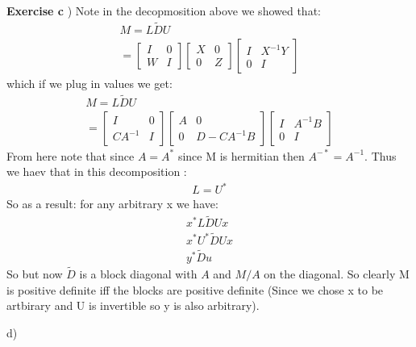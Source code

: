 \documentclass[12pt]{article}
\newenvironment{exercise}[1]{\vspace{.1in}\noindent\textbf{Exercise #1 \hspace{.05em}}}{}
\theoremstyle{definition}
\theoremstyle{remark}
\begin{document}
\begin{exercise}{6.5}
	c) Note in the decopmosition above we showed that:
	\begin{align}
		M=L\tilde{D}U \\
		=%
		\begin{bmatrix}
			I & 0 \\
			W & I
		\end{bmatrix}%
		\begin{bmatrix}
			X & 0 \\
			0 & Z
		\end{bmatrix}%
		\begin{bmatrix}
			I & X^{-1}Y \\
			0 & I
		\end{bmatrix}
	\end{align}
	which if we plug in values we get:
	\begin{align}
		M=L\tilde{D}U \\
		=%
		\begin{bmatrix}
			I       & 0 \\
			CA^{-1} & I
		\end{bmatrix}%
		\begin{bmatrix}
			A & 0          \\
			0 & D-CA^{-1}B
		\end{bmatrix}%
		\begin{bmatrix}
			I & A^{-1}B \\
			0 & I
		\end{bmatrix}
	\end{align}
	From here note that since $A=A^*$ since M is hermitian then $A^{-*}=A^{-1}$. Thus we haev that in this decomposition :
	\begin{align}
		L=U^*
	\end{align}
	So as a result: for any arbitrary x we have:
	\begin{align}
		x^*L \tilde{D}Ux   \\
		x^*U^* \tilde{D}Ux \\
		y^*\tilde D u
	\end{align}
	So but now $\tilde D$ is a block diagonal with $A$ and $M/A$ on the diagonal. So clearly M is positive  definite iff the blocks are positive definite (Since we chose x to be artbirary and U is invertible so y is also arbitrary).


	d)


\end{exercise}
\end{document}
